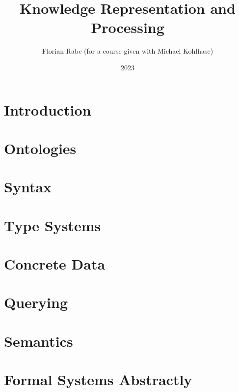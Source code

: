 \documentclass{beamer}
\begin{document}
\title{Knowledge Representation and Processing}
\author{Florian Rabe (for a course given with Michael Kohlhase)}
\date{2023}
\begin{frame}
    \titlepage
\end{frame}

\part{Introduction}


\part{Ontologies}


\part{Syntax}


\part{Type Systems}


\part{Concrete Data}


\part{Querying}


\part{Semantics}


\part{Formal Systems Abstractly}

\end{document}
